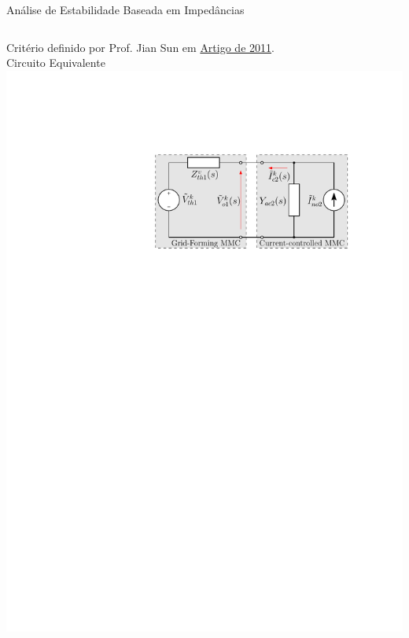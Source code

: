 %
\begin{frame}{Análise de Estabilidade Baseada em Impedâncias}



\begin{columns}


Critério definido por Prof. Jian Sun em {\color{blue}\href{https://ieeexplore.ieee.org/document/5741855}{Artigo de 2011}}.\\[20pt] 

\centering
Circuito Equivalente\\[15pt]

\includegraphics[width=0.85\linewidth]{./figuras/aplicacao/stability_ca}





\end{columns}
\end{frame}
